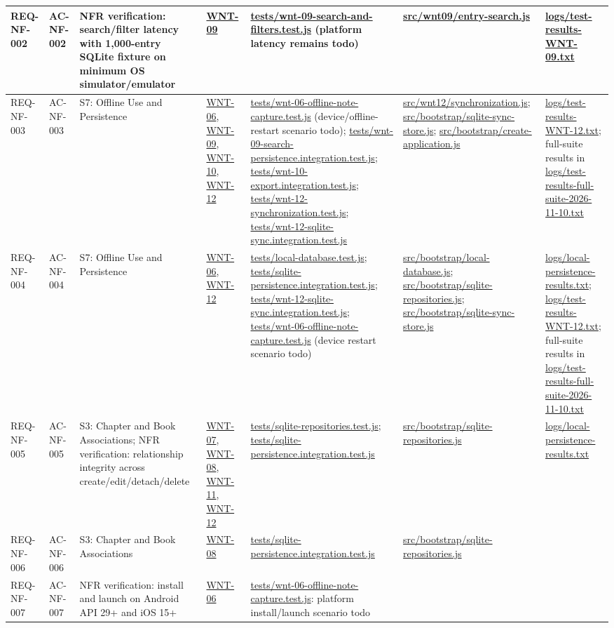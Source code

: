 \documentclass[10pt,a4paper]{article}
\renewcommand{\texttt}[1]{\url{#1}}
\begin{document}
\begin{longtable}{|L{2.5cm}|L{2.6cm}|L{4.4cm}|L{3.3cm}|L{3.3cm}|L{3.3cm}|L{3.3cm}|}
REQ-NF-002 & AC-NF-002 & NFR verification: search/filter latency with 1,000-entry SQLite fixture on minimum OS simulator/emulator & \texttt{WNT-09} & \texttt{tests/wnt-09-search-and-filters.test.js} (platform latency remains todo) & \texttt{src/wnt09/entry-search.js} & \texttt{logs/test-results-WNT-09.txt} \\ \hline
REQ-NF-003 & AC-NF-003 & S7: Offline Use and Persistence & \texttt{WNT-06}, \texttt{WNT-09}, \texttt{WNT-10}, \texttt{WNT-12} & \texttt{tests/wnt-06-offline-note-capture.test.js} (device/offline-restart scenario todo); \texttt{tests/wnt-09-search-persistence.integration.test.js}; \texttt{tests/wnt-10-export.integration.test.js}; \texttt{tests/wnt-12-synchronization.test.js}; \texttt{tests/wnt-12-sqlite-sync.integration.test.js} & \texttt{src/wnt12/synchronization.js}; \texttt{src/bootstrap/sqlite-sync-store.js}; \texttt{src/bootstrap/create-application.js} & \texttt{logs/test-results-WNT-12.txt}; full-suite results in \texttt{logs/test-results-full-suite-2026-11-10.txt} \\ \hline
REQ-NF-004 & AC-NF-004 & S7: Offline Use and Persistence & \texttt{WNT-06}, \texttt{WNT-12} & \texttt{tests/local-database.test.js}; \texttt{tests/sqlite-persistence.integration.test.js}; \texttt{tests/wnt-12-sqlite-sync.integration.test.js}; \texttt{tests/wnt-06-offline-note-capture.test.js} (device restart scenario todo) & \texttt{src/bootstrap/local-database.js}; \texttt{src/bootstrap/sqlite-repositories.js}; \texttt{src/bootstrap/sqlite-sync-store.js} & \texttt{logs/local-persistence-results.txt}; \texttt{logs/test-results-WNT-12.txt}; full-suite results in \texttt{logs/test-results-full-suite-2026-11-10.txt} \\ \hline
REQ-NF-005 & AC-NF-005 & S3: Chapter and Book Associations; NFR verification: relationship integrity across create/edit/detach/delete & \texttt{WNT-07}, \texttt{WNT-08}, \texttt{WNT-11}, \texttt{WNT-12} & \texttt{tests/sqlite-repositories.test.js}; \texttt{tests/sqlite-persistence.integration.test.js} & \texttt{src/bootstrap/sqlite-repositories.js} & \texttt{logs/local-persistence-results.txt} \\ \hline
REQ-NF-006 & AC-NF-006 & S3: Chapter and Book Associations & \texttt{WNT-08} & \texttt{tests/sqlite-persistence.integration.test.js} & \texttt{src/bootstrap/sqlite-repositories.js} & \\ \hline
REQ-NF-007 & AC-NF-007 & NFR verification: install and launch on Android API 29+ and iOS 15+ & \texttt{WNT-06} & \texttt{tests/wnt-06-offline-note-capture.test.js}: platform install/launch scenario todo & & \\ \hline

\end{longtable}
\end{document}
